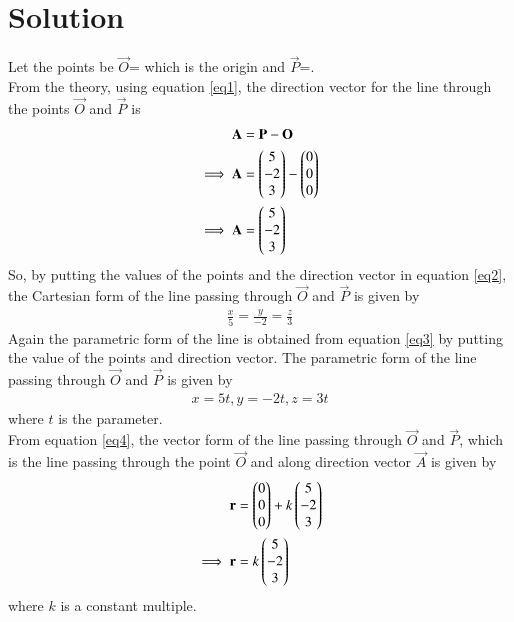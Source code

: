 \documentclass[journal,12pt,twocolumn]{IEEEtran}
\begin{document}
\section{\textbf{Solution}}
Let the points be $\vec{O}$= which is the origin and $\vec{P}$=.\\
From the theory, using equation \ref{eq1}, the direction vector for the line through the points $\vec{O}$ and $\vec{P}$ is
\begin{align}
\mathbf{A} &= \mathbf{P}-\mathbf{O} \\
\implies\mathbf{A} & = \begin{pmatrix} 5 \\ -2 \\ 3 \end{pmatrix} - \begin{pmatrix} 0 \\ 0 \\ 0\end{pmatrix} \\
\implies\mathbf{A} &= \begin{pmatrix} 5 \\ -2 \\ 3 \end{pmatrix}
\end{align}
So, by putting the values of the points and the direction vector in equation \ref{eq2}, the Cartesian form of the line passing through $\vec{O}$ and $\vec{P}$ is given by 
\begin{align}
\frac{x}{5}=\frac{y}{-2}=\frac{z}{3}
\end{align}
Again the parametric form of the line is obtained from equation \ref{eq3} by putting the value of the points and direction vector. The parametric form of the line passing through $\vec{O}$ and $\vec{P}$ is given by
\begin{align}
x=5t, y=-2t, z=3t
\end{align}
where $t$ is the parameter.
\\From equation \ref{eq4}, the vector form of the line passing through $\vec{O}$ and $\vec{P}$, which is the line passing through the point $\vec{O}$ and along direction vector $\vec{A}$ is given by
\begin{align}
\mathbf{r} &= \begin{pmatrix}0 \\ 0 \\ 0\end{pmatrix}+k\begin{pmatrix}5 \\ -2 \\ 3\end{pmatrix}\\
\implies\mathbf{r} &= k\begin{pmatrix}5 \\ -2 \\ 3\end{pmatrix}
\end{align}
where $k$ is a constant multiple.
\end{document}
